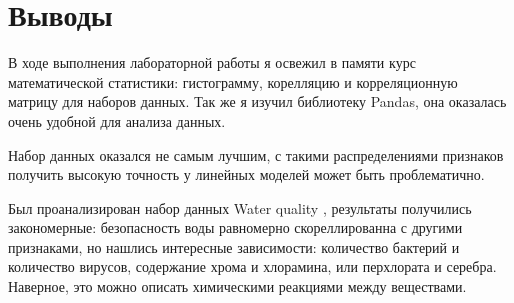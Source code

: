 \section{Выводы}
В ходе выполнения лабораторной работы я освежил в памяти курс математической статистики: гистограмму, корелляцию и корреляционную матрицу 
для наборов данных. Так же я изучил библиотеку Pandas, она оказалась очень удобной для анализа данных.

Набор данных оказался не самым лучшим, с такими распределениями признаков получить высокую точность у линейных моделей может быть проблематично.

Был проанализирован набор данных Water quality \cite{kaggle}, результаты получились закономерные: безопасность воды равномерно скореллированна с другими признаками, но нашлись интересные зависимости: количество бактерий и количество вирусов, содержание хрома и хлорамина, или перхлората и серебра. Наверное, это можно описать химическими реакциями между веществами.
\pagebreak

